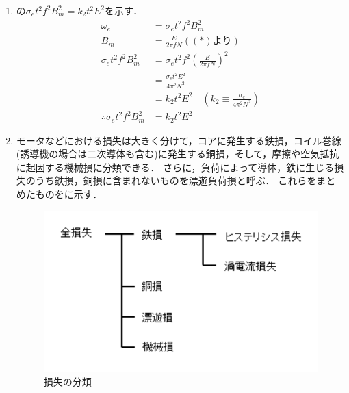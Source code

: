 \begin{enumerate}[1.]
\item {}の$\sigma_{e}t^{2}f^{2}B_{m}^{2}=k_{2}t^{2}E^{2}$を示す．
\begin{align*}
	\omega_{e}&=\sigma_{e}t^{2}f^{2}B_{m}^{2}\\
	B_{m}&=\frac{E}{2\pi f N}\left((*)より\right)\\
	\sigma_{e}t^{2}f^{2}B_{m}^{2}&=\sigma_{e}t^{2}f^{2}\left(\frac{E}{2\pi f N}\right)^{2}\\
	&=\frac{\sigma_{e}t^{2}E^{2}}{4\pi^{2}N^{2}}\\
	&=k_{2}t^{2}E^{2}\quad \left(k_{2}\equiv\frac{\sigma_{e}}{4\pi^{2}N^{2}}\right)\\
	\therefore \sigma_{e}t^{2}f^{2}B_{m}^{2}&=k_{2}t^{2}E^{2}
\end{align*}
\item モータなどにおける損失は大きく分けて，コアに発生する鉄損，コイル巻線(誘導機の場合は二次導体も含む)に発生する銅損，そして，摩擦や空気抵抗に起因する機械損に分類できる．
さらに，負荷によって導体，鉄に生じる損失のうち鉄損，銅損に含まれないものを漂遊負荷損と呼ぶ．
これらをまとめたものをに示す．
\begin{figure}[h]
	\centering
	\includegraphics[scale=0.8]{./fig/loss_analysis.pdf}
	\caption{損失の分類\cite{fdls}}
	\label{fig:loss_analysis}
\end{figure}
\end{enumerate}
